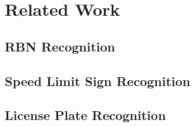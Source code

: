 \chapter{Related Work}
\label{ch:related_work}


\section{RBN Recognition}


\section{Speed Limit Sign Recognition}


\section{License Plate Recognition}

